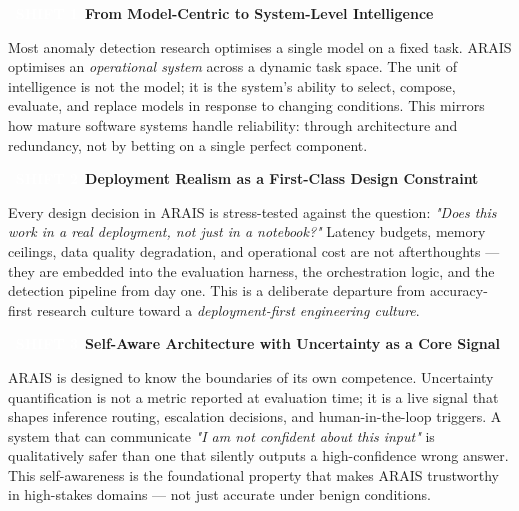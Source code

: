 \documentclass[11pt, a4paper]{article}
\newcommand{\mytag}[1]{%
  \textcolor{white}{\colorbox{accent}{\footnotesize\bfseries\, #1\,}}%
}
\begin{document}
\vspace{8pt}

\begin{diffbox}
\noindent\mytag{SHIFT 1}\quad\textbf{From Model-Centric to System-Level Intelligence}

\smallskip
Most anomaly detection research optimises a single model on a fixed task.
ARAIS optimises an \textit{operational system} across a dynamic task space.
The unit of intelligence is not the model; it is the system's ability to select, 
compose, evaluate, and replace models in response to changing conditions.
This mirrors how mature software systems handle reliability: through architecture and 
redundancy, not by betting on a single perfect component.
\end{diffbox}

\vspace{8pt}

\begin{diffbox}
\noindent\mytag{SHIFT 2}\quad\textbf{Deployment Realism as a First-Class Design Constraint}

\smallskip
Every design decision in ARAIS is stress-tested against the question:
\textit{"Does this work in a real deployment, not just in a notebook?"}
Latency budgets, memory ceilings, data quality degradation, 
and operational cost are not afterthoughts — they are embedded into the evaluation harness, 
the orchestration logic, and the detection pipeline from day one.
This is a deliberate departure from accuracy-first research culture 
toward a \textit{deployment-first engineering culture}.
\end{diffbox}

\vspace{8pt}

\begin{diffbox}
\noindent\mytag{SHIFT 3}\quad\textbf{Self-Aware Architecture with Uncertainty as a Core Signal}

\smallskip
ARAIS is designed to know the boundaries of its own competence.
Uncertainty quantification is not a metric reported at evaluation time; 
it is a live signal that shapes inference routing, escalation decisions, 
and human-in-the-loop triggers.
A system that can communicate \textit{"I am not confident about this input"} 
is qualitatively safer than one that silently outputs a high-confidence wrong answer.
This self-awareness is the foundational property that makes ARAIS trustworthy in high-stakes domains —
not just accurate under benign conditions.
\end{diffbox}
\end{document}
